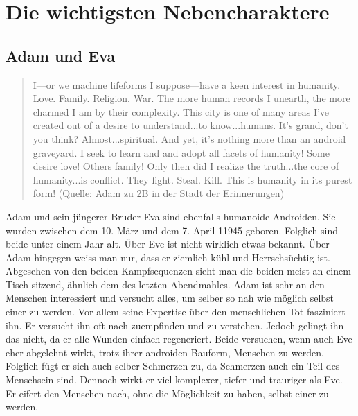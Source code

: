 \section{Die wichtigsten Nebencharaktere}


\subsection{Adam und Eva}
\begin{quote}
	\dq I—or we machine lifeforms I suppose—have a keen interest in humanity. Love. Family. Religion. War. The more human records I unearth, the more charmed I am by their complexity. This city is one of many areas I've created out of a desire to understand...to know...humans. It's grand, don't you think? Almost...spiritual. And yet, it's nothing more than an android graveyard. I seek to learn and and adopt all facets of humanity! Some desire love! Others family! Only then did I realize the truth...the core of humanity...is conflict. They fight. Steal. Kill. This is humanity in its purest form! \dq (Quelle: Adam zu 2B in der Stadt der Erinnerungen) ~\cite{verschiedene2019npc}
\end{quote}

Adam und sein jüngerer Bruder Eva sind ebenfalls humanoide Androiden. Sie wurden zwischen dem 10. März und dem 7. April 11945 geboren. Folglich sind beide unter einem Jahr alt. Über Eve ist nicht wirklich etwas bekannt. Über Adam hingegen weiss man nur, dass er ziemlich kühl und Herrschsüchtig ist. Abgesehen von den beiden Kampfsequenzen sieht man die beiden meist an einem  Tisch sitzend, ähnlich dem des letzten Abendmahles. Adam ist sehr an den Menschen interessiert und versucht alles, um selber so nah wie möglich selbst einer zu werden. Vor allem seine Expertise über den menschlichen Tot fasziniert ihn. Er versucht ihn oft nach zuempfinden und zu verstehen. Jedoch gelingt ihn das nicht, da er alle \dq Wunden \dq einfach regeneriert. Beide versuchen, wenn auch Eve eher abgelehnt wirkt, trotz ihrer androiden Bauform, Menschen zu werden. Folglich fügt er sich auch selber Schmerzen zu, da Schmerzen auch ein Teil des Menschsein sind. Dennoch wirkt er viel komplexer, tiefer und trauriger als Eve. Er eifert den Menschen nach, ohne die Möglichkeit zu haben, selbst einer zu werden.

\clearpage


